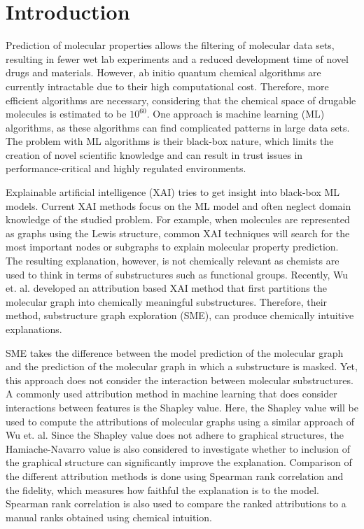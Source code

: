 \chapter{Introduction}


Prediction of molecular properties allows the filtering of molecular data sets, 
resulting in fewer wet lab experiments and a reduced development time of novel 
drugs and materials.\cite{adelusi2022molecular} However, ab initio quantum chemical algorithms are currently 
intractable due to their high computational cost.\cite{szabo2012modern} Therefore, more efficient 
algorithms are necessary, considering that the chemical space of drugable molecules 
is estimated to be $10^{60}$. One approach is machine learning (ML) algorithms, as these 
algorithms can find complicated patterns in large data sets.\cite{gorgulla2022emerging} The problem with ML 
algorithms is their black-box nature, which limits the creation of novel scientific 
knowledge and can result in trust issues in performance-critical and highly regulated 
environments.\cite{carvalho2019machine}


Explainable artificial intelligence (XAI) tries to get insight into black-box 
ML models.\cite{carvalho2019machine, yuan2022explainability} 
Current XAI methods focus on the ML model and often neglect domain 
knowledge of the studied problem. For example, when molecules are represented 
as graphs using the Lewis structure\cite{ahmad1992drawing}, common XAI techniques will search for the 
most important nodes or subgraphs to explain molecular property prediction.\cite{wu2023chemistry} The 
resulting explanation, however, is not chemically relevant as chemists are used 
to think in terms of substructures such as functional groups. Recently, Wu et. 
al. developed an attribution based XAI method that first partitions the molecular graph into 
chemically meaningful substructures. Therefore, their method, substructure graph 
exploration (SME), can produce chemically intuitive explanations.\cite{wu2023chemistry}


SME takes the difference between the model prediction of the molecular graph and 
the prediction of the molecular graph in which a substructure is masked. Yet, 
this approach does not consider the interaction between molecular substructures.
A commonly used attribution method in machine learning that does consider 
interactions between features is the Shapley value. Here, the Shapley value\cite{shapley1953value} will 
be used to compute the attributions of molecular graphs using a similar approach 
of Wu et. al. Since the Shapley value does not adhere to graphical structures, 
the Hamiache-Navarro value\cite{hamiache_value_1999} is also considered to investigate whether to inclusion 
of the graphical structure can significantly improve the explanation. Comparison 
of the different attribution methods is done using Spearman rank correlation and 
the fidelity\cite{carvalho2019machine}, which measures how faithful the explanation is to the model. Spearman 
rank correlation is also used to compare the ranked attributions to a manual ranks
obtained using chemical intuition. 



